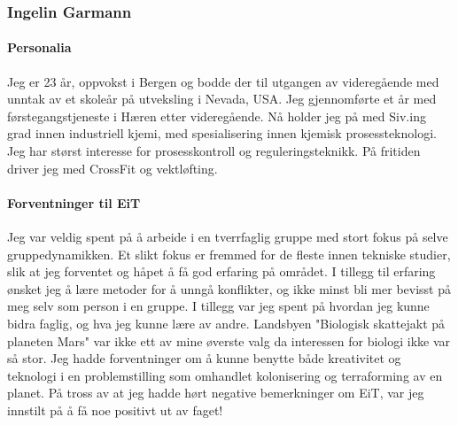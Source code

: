 \subsubsection{Ingelin Garmann}

\paragraph{Personalia}
Jeg er 23 år, oppvokst i Bergen og bodde der til utgangen av videregående med unntak av et skoleår på utveksling i Nevada, USA.
Jeg gjennomførte et år med førstegangstjeneste i Hæren etter videregående.
Nå holder jeg på med Siv.ing grad innen industriell kjemi, med spesialisering innen kjemisk prosessteknologi. Jeg har størst interesse for prosesskontroll og reguleringsteknikk.
På fritiden driver jeg med CrossFit og vektløfting.

\paragraph{Forventninger til EiT}
Jeg var veldig spent på å arbeide i en tverrfaglig gruppe med stort fokus på selve gruppedynamikken.
Et slikt fokus er fremmed for de fleste innen tekniske studier, slik at jeg forventet og håpet å få god erfaring på området.
I tillegg til erfaring ønsket jeg å lære metoder for å unngå konflikter, og ikke minst bli mer bevisst på meg selv som person i en gruppe.
I tillegg var jeg spent på hvordan jeg kunne bidra faglig, og hva jeg kunne lære av andre.
Landsbyen "Biologisk skattejakt på planeten Mars" var ikke ett av mine øverste valg da interessen for biologi ikke var så stor.
Jeg hadde forventninger om å kunne benytte både kreativitet og teknologi i en problemstilling som omhandlet kolonisering og terraforming av en planet.
På tross av at jeg hadde hørt negative bemerkninger om EiT, var jeg innstilt på å få noe positivt ut av faget!
